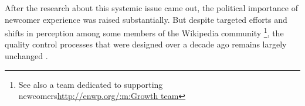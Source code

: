 After the research about this systemic issue came out, the political importance of newcomer experience was raised substantially.  But despite targeted efforts and shifts in perception among some members of the Wikipedia community \cite{narayan2015effects, morgan2013tea}\footnote{See also a team dedicated to supporting newcomers\url{http://enwp.org/:m:Growth team}}, the quality control processes that were designed over a decade ago remains largely unchanged \cite{halfaker2014snuggle}.
